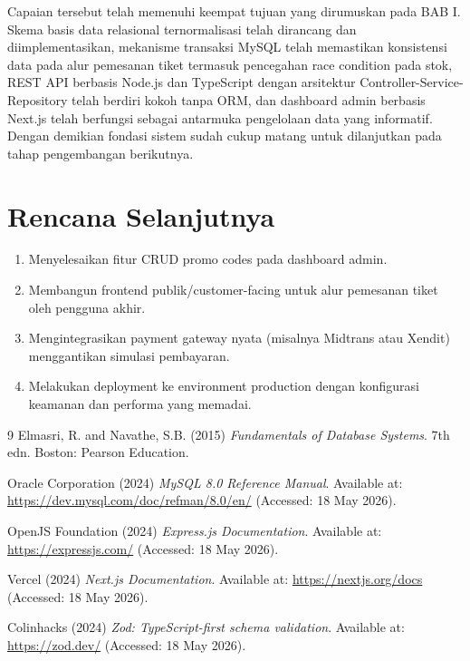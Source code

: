 \documentclass[12pt,a4paper]{report}
\begin{document}
Capaian tersebut telah memenuhi keempat tujuan yang dirumuskan pada BAB I. Skema basis data relasional ternormalisasi telah dirancang dan diimplementasikan, mekanisme transaksi MySQL telah memastikan konsistensi data pada alur pemesanan tiket termasuk pencegahan race condition pada stok, REST API berbasis Node.js dan TypeScript dengan arsitektur Controller-Service-Repository telah berdiri kokoh tanpa ORM, dan dashboard admin berbasis Next.js telah berfungsi sebagai antarmuka pengelolaan data yang informatif. Dengan demikian fondasi sistem sudah cukup matang untuk dilanjutkan pada tahap pengembangan berikutnya.

\section{Rencana Selanjutnya}
\begin{enumerate}
    \item Menyelesaikan fitur CRUD promo codes pada dashboard admin.
    \item Membangun frontend publik/customer-facing untuk alur pemesanan tiket oleh pengguna akhir.
    \item Mengintegrasikan payment gateway nyata (misalnya Midtrans atau Xendit) menggantikan simulasi pembayaran.
    \item Melakukan deployment ke environment production dengan konfigurasi keamanan dan performa yang memadai.
\end{enumerate}

\renewcommand{\bibname}{Daftar Pustaka}
\begin{thebibliography}{9}
  Elmasri, R. and Navathe, S.B. (2015)
  \textit{Fundamentals of Database Systems}. 7th edn.
  Boston: Pearson Education.

  Oracle Corporation (2024)
  \textit{MySQL 8.0 Reference Manual}.
  Available at: \url{https://dev.mysql.com/doc/refman/8.0/en/} (Accessed: 18 May 2026).

  OpenJS Foundation (2024)
  \textit{Express.js Documentation}.
  Available at: \url{https://expressjs.com/} (Accessed: 18 May 2026).

  Vercel (2024)
  \textit{Next.js Documentation}.
  Available at: \url{https://nextjs.org/docs} (Accessed: 18 May 2026).

  Colinhacks (2024)
  \textit{Zod: TypeScript-first schema validation}.
  Available at: \url{https://zod.dev/} (Accessed: 18 May 2026).
\end{thebibliography}
\end{document}
